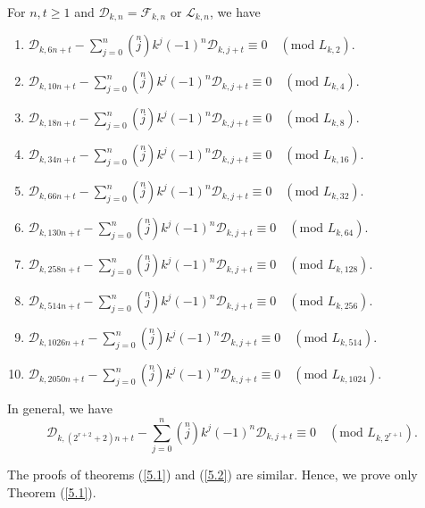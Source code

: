 \begin{theorem}For $n, t\geq 1$ and $\mathcal{D}_{k,n}=\mathcal{F}_{k,n}$ or $\mathcal{L}_{k,n}$, we have\label{5.2}
\begin{enumerate}
\item $\mathcal{D}_{k,6n+t}-\sum\limits_{j=0}^{n}\left( \stackrel{n}{j}\right) k^{j}(-1)^{n} \mathcal{D}_{k,j+t}\equiv 0\quad (\text{mod } L_{k,2}) $.
\item $\mathcal{D}_{k,10n+t}-\sum\limits_{j=0}^{n}\left( \stackrel{n}{j}\right) k^{j}(-1)^{n} \mathcal{D}_{k,j+t}\equiv 0\quad (\text{mod } L_{k,4}) $.
\item $\mathcal{D}_{k,18n+t}-\sum\limits_{j=0}^{n}\left( \stackrel{n}{j}\right) k^{j}(-1)^{n} \mathcal{D}_{k,j+t}\equiv 0\quad (\text{mod } L_{k,8}) $.
\item $\mathcal{D}_{k,34n+t}-\sum\limits_{j=0}^{n}\left( \stackrel{n}{j}\right) k^{j}(-1)^{n} \mathcal{D}_{k,j+t}\equiv 0\quad (\text{mod } L_{k,16}) $.
\item $\mathcal{D}_{k,66n+t}-\sum\limits_{j=0}^{n}\left( \stackrel{n}{j}\right) k^{j}(-1)^{n} \mathcal{D}_{k,j+t}\equiv 0\quad (\text{mod } L_{k,32}) $.
\item $\mathcal{D}_{k,130n+t}-\sum\limits_{j=0}^{n}\left( \stackrel{n}{j}\right) k^{j}(-1)^{n} \mathcal{D}_{k,j+t}\equiv 0\quad (\text{mod } L_{k,64}) $.
\item $\mathcal{D}_{k,258n+t}-\sum\limits_{j=0}^{n}\left( \stackrel{n}{j}\right) k^{j}(-1)^{n} \mathcal{D}_{k,j+t}\equiv 0\quad (\text{mod } L_{k,128}) $.
\item $\mathcal{D}_{k,514n+t}-\sum\limits_{j=0}^{n}\left( \stackrel{n}{j}\right) k^{j}(-1)^{n} \mathcal{D}_{k,j+t}\equiv 0\quad (\text{mod } L_{k,256}) $.
\item $\mathcal{D}_{k,1026n+t}-\sum\limits_{j=0}^{n}\left( \stackrel{n}{j}\right) k^{j}(-1)^{n} \mathcal{D}_{k,j+t}\equiv 0\quad (\text{mod } L_{k,514}) $.
\item $\mathcal{D}_{k,2050n+t}-\sum\limits_{j=0}^{n}\left( \stackrel{n}{j}\right) k^{j}(-1)^{n} \mathcal{D}_{k,j+t}\equiv 0\quad (\text{mod } L_{k,1024}) $.
\end{enumerate}
In general, we have
$$\mathcal{D}_{k,(2^{r+2}+2)n+t}-\sum\limits_{j=0}^{n}\left( \stackrel{n}{j}\right) k^{j}(-1)^{n}\mathcal{D}_{k,j+t}\equiv 0\quad (\text{mod } L_{k,2^{r+1}}). $$
\end{theorem}
\noindent The proofs of theorems (\ref{5.1}) and (\ref{5.2}) are similar. Hence, we prove only Theorem (\ref{5.1}).\\
